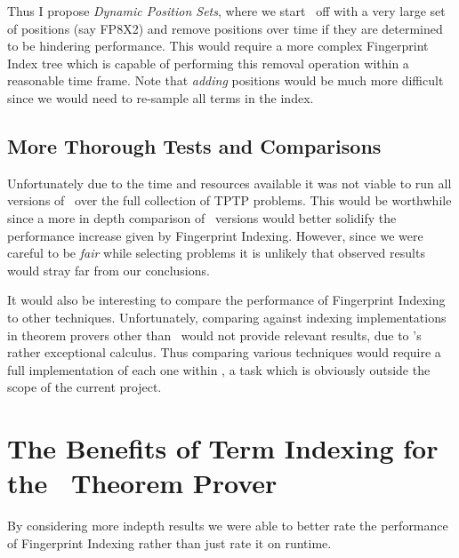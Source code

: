 Thus I propose \emph{Dynamic Position Sets}, where we start \beagle\ off with a
very large set of positions (say FP8X2) and remove positions over time if they
are determined to be hindering performance. This would require a more complex Fingerprint
Index tree which is capable of performing this removal operation within a reasonable
time frame. Note that \emph{adding} positions would be much more difficult since
we would need to re-sample all terms in the index.

\subsection{More Thorough Tests and Comparisons}

Unfortunately due to the time and resources available it was not viable to run
all versions of \beagle\ over the full collection of TPTP problems. This would
be worthwhile since a more in depth comparison 
of \beagle\ versions would better solidify the performance increase given by Fingerprint Indexing.
However, since we were careful to be \emph{fair}
while selecting problems it is unlikely that observed results would stray far
from our conclusions.

It would also be interesting to compare the performance of Fingerprint Indexing
to other techniques. Unfortunately, comparing against indexing implementations in theorem provers other
than \beagle\ would not provide relevant results, due to \beagle's rather
exceptional calculus. Thus comparing various techniques would require a full
implementation of each one within \beagle, a task which is obviously outside the scope of the current
project. 

\section{The Benefits of Term Indexing for the \Beagle\ Theorem Prover }
\label{sec:why}

By considering more indepth results we were able to better rate the performance
of Fingerprint Indexing rather than just rate it on runtime.

